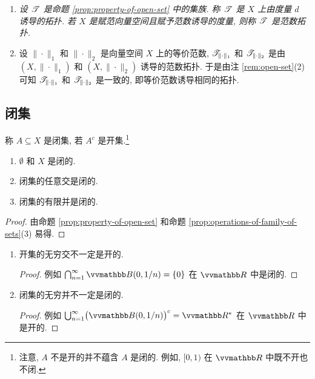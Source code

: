 \begin{remark}
    \begin{enumerate}
        \item \textsl{设 \(\mathscr T\) 是命题 \ref{prop:property-of-open-set} 中的集族. 称 \(\mathscr T\) 是 \(X\) 上由度量 \(d\) 诱导的拓扑. 若 \(X\) 是赋范向量空间且赋予范数诱导的度量, 则称 \(\mathscr T\) 是范数拓扑.}
        \item 设 \(\|\!\cdot\!\|_1\) 和 \(\|\!\cdot\!\|_2\) 是向量空间 \(X\) 上的等价范数, \(\mathscr T_{\|\cdot\|_1}\) 和 \(\mathscr T_{\|\cdot\|_2}\) 是由 \((X, \|\!\cdot\!\|_1)\) 和 \((X, \|\!\cdot\!\|_2)\) 诱导的范数拓扑. 于是由注 \ref{rem:open-set}(2) 可知 \(\mathscr T_{\|\cdot\|_1}\) 和 \(\mathscr T_{\|\cdot\|_2}\) 是一致的, 即等价范数诱导相同的拓扑.
    \end{enumerate}
\end{remark}

\subsection{闭集}

\begin{definition}[闭集]
    称 \(A \subseteq X\) 是闭集, 若 \(A^c\) 是开集.\footnote{注意, \(A\) 不是开的并不蕴含 \(A\) 是闭的. 例如, \([0, 1)\) 在 \(\R\) 中既不开也不闭.}
\end{definition}

\begin{proposition}\label{prop:property-of-closed-set}
    \begin{enumerate}
        \item \(\emptyset\) 和 \(X\) 是闭的.
        \item 闭集的任意交是闭的.
        \item 闭集的有限并是闭的.
    \end{enumerate}
\end{proposition}

\begin{proof}
    由命题 \ref{prop:property-of-open-set} 和命题 \ref{prop:operations-of-family-of-sets}(3) 易得.
\end{proof}

\begin{remark}
    \begin{enumerate}
        \item 开集的无穷交不一定是开的.
        \begin{proof}
            例如 \(\bigcap_{n = 1}^\infty \B(0, 1 / n) = \{0\}\) 在 \(\R\) 中是闭的.
        \end{proof}
        \item 闭集的无穷并不一定是闭的.
        \begin{proof}
            例如 \(\bigcup_{n = 1}^\infty \bigl(\B(0, 1 / n)\bigr)^c = \R^\ast\) 在 \(\R\) 中是开的.
        \end{proof}
    \end{enumerate}
\end{remark}

